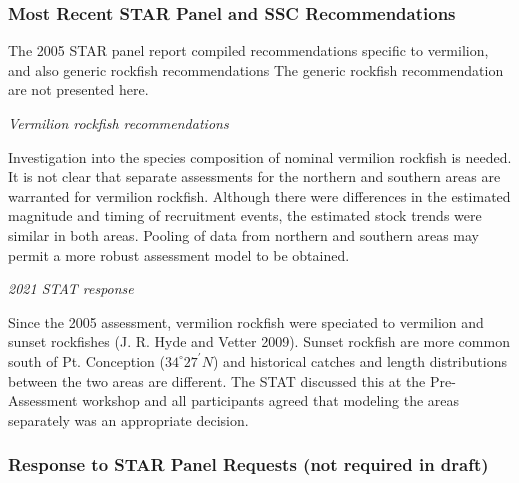 \documentclass[11pt,
  english,
  a4paper,
]{article}
\begin{document}

\hypertarget{most-recent-star-panel-and-ssc-recommendations}{%
\subsubsection{Most Recent STAR Panel and SSC Recommendations}\label{most-recent-star-panel-and-ssc-recommendations}}

\leavevmode\tagmcend\tagstructend

The 2005 STAR panel report compiled recommendations specific to vermilion, and also generic rockfish recommendations The generic rockfish recommendation are not presented here.

\emph{Vermilion rockfish recommendations}

Investigation into the species composition of nominal vermilion rockfish is needed. It is not clear that separate assessments for the northern and southern areas are warranted for vermilion rockfish. Although there were differences in the estimated magnitude and timing of recruitment events, the estimated stock trends were similar in both areas. Pooling of data from northern and southern areas may permit a more robust assessment model to be obtained.

\emph{2021 STAT response}

Since the 2005 assessment, vermilion rockfish were speciated to vermilion and sunset rockfishes {(J. R. Hyde and Vetter 2009)\leavevmode\tagmcend\tagstructend}. Sunset rockfish are more common south of Pt. Conception ($34^\circ 27^\prime N$) and historical catches and length distributions between the two areas are different. The STAT discussed this at the Pre-Assessment workshop and all participants agreed that modeling the areas separately was an appropriate decision.


\hypertarget{response-to-star-panel-requests-not-required-in-draft}{%
\subsubsection{Response to STAR Panel Requests (not required in draft)}\label{response-to-star-panel-requests-not-required-in-draft}}

\leavevmode\tagmcend\tagstructend

\end{document}
